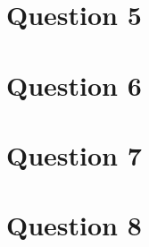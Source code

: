 \documentclass[12pt]{article}
\begin{document}
\section*{Question 5}

\section*{Question 6}

\section*{Question 7}

\section*{Question 8}
\end{document}
